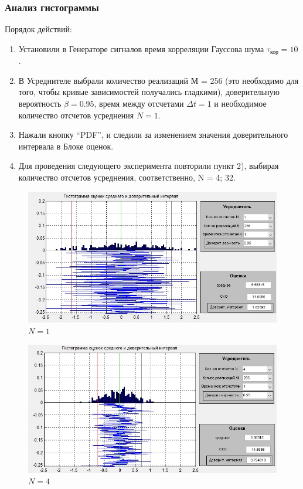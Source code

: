 \subsubsection[Задание 6.1]{Анализ гистограммы}
Порядок действий:
\begin{enumerate}
	\item Установили в Генераторе сигналов время корреляции Гауссова шума $\tau_\text{кор}=10$.
	\item В Усреднителе выбрали количество реализаций М = 256 (это необходимо для того, чтобы кривые зависимостей получались гладкими), доверительную вероятность $\beta = 0.95$, время между отсчетами $\Delta t = 1$ и необходимое количество отсчетов усреднения $N=1$.
	\item Нажали кнопку “PDF”, и следили за изменением значения доверительного интервала в Блоке оценок.
	\item Для проведения следующего эксперимента повторили пункт 2), выбирая количество отсчетов усреднения, соответственно, N = 4; 32.
\end{enumerate}
 \begin{figure}[H]
		\centering
		\includegraphics[width=0.8\linewidth]{tasks/task6/realize_N=1}
		\caption*{$N=1$}
\end{figure}
 \begin{figure}[H]
		\centering
		\includegraphics[width=0.8\linewidth]{tasks/task6/realize_N=4}
		\caption*{$N=4$}
\end{figure}
